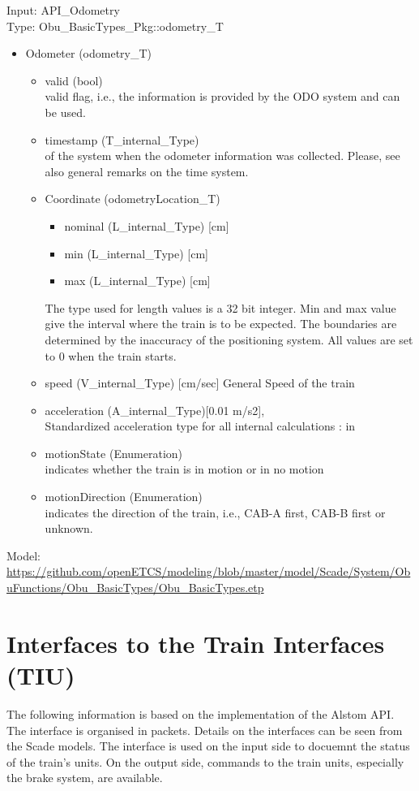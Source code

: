 \documentclass{template/openetcs_report}
\begin{document}
Input: API\_Odometry\\
Type: Obu\_BasicTypes\_Pkg::odometry\_T

\begin{itemize}
\item Odometer (odometry\_T)
\begin{itemize}
\item valid (bool)\\
valid flag, i.e., the information is provided by the ODO system and can be used.
\item timestamp (T\_internal\_Type)\\
of the system when the odometer information was collected. Please, see also general remarks on the time system. 
\item Coordinate (odometryLocation\_T)
\begin{itemize}
\item nominal (L\_internal\_Type) [cm]
\item min (L\_internal\_Type) [cm]
\item max (L\_internal\_Type) [cm]
\end{itemize}
The type used for length values is a 32 bit integer. 
Min and max value give the interval where the train is to be expected. The boundaries are determined by the inaccuracy of the positioning system. All values are set to 0 when the train starts.
\item speed (V\_internal\_Type) [cm/sec]
General Speed of the train
\item acceleration (A\_internal\_Type)[0.01 m/s2],\\
Standardized acceleration type for all internal calculations : in 
\item motionState (Enumeration)\\
indicates whether the train is in motion or in no motion
\item motionDirection (Enumeration)\\
indicates the direction of the train, i.e., CAB-A first, CAB-B first or unknown.
\end{itemize}
\end{itemize}

Model: \url{https://github.com/openETCS/modeling/blob/master/model/Scade/System/ObuFunctions/Obu_BasicTypes/Obu_BasicTypes.etp}

\section{Interfaces to the Train Interfaces (TIU)}
The following information is based on the implementation of the Alstom API. The interface is organised in packets. Details on the interfaces can be seen from the Scade models. The interface is used on the input side to docuemnt the status of the train's units. On the output side, commands to the train units, especially the brake system, are available.
\end{document}
